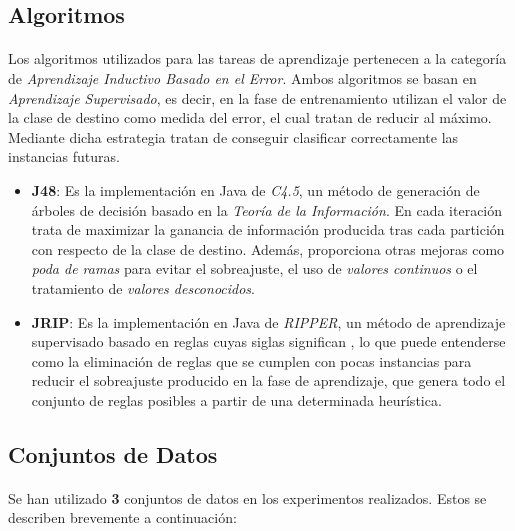 \documentclass{article}
\begin{document}
		\subsection{Algoritmos}

			\paragraph{}
			Los algoritmos utilizados para las tareas de aprendizaje pertenecen a la categoría de \emph{Aprendizaje Inductivo Basado en el Error}. Ambos algoritmos se basan en \emph{Aprendizaje Supervisado}, es decir, en la fase de entrenamiento utilizan el valor de la clase de destino como medida del error, el cual tratan de reducir al máximo. Mediante dicha estrategia tratan de conseguir clasificar correctamente las instancias futuras.

			\begin{itemize}

				\item \textbf{J48}: Es la implementación en Java de \emph{C4.5}, un método de generación de árboles de decisión basado en la \emph{Teoría de la Información}. En cada iteración trata de maximizar la ganancia de información producida tras cada partición con respecto de la clase de destino. Además, proporciona otras mejoras como \emph{poda de ramas} para evitar el sobreajuste, el uso de \emph{valores continuos} o el tratamiento de \emph{valores desconocidos}.


				\item \textbf{JRIP}: Es la implementación en Java de \emph{RIPPER}, un método de aprendizaje supervisado basado en reglas cuyas siglas significan , lo que puede entenderse como la eliminación de reglas que se cumplen con pocas instancias para reducir el sobreajuste producido en la fase de aprendizaje, que genera todo el conjunto de reglas posibles a partir de una determinada heurística.

			\end{itemize}

		\subsection{Conjuntos de Datos}

			\paragraph{}
			Se han utilizado \textbf{3} conjuntos de datos en los experimentos realizados. Estos se describen brevemente a continuación:
\end{document}
